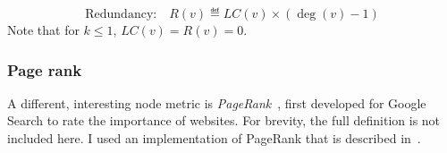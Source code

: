\begin{equation}
    \text{Redundancy:}\quad R(v) \eqdef LC (v) \times (\deg(v) - 1)
\end{equation}
Note that for $k \leq 1$, $LC(v) = R(v) = 0$.

\subsubsection*{Page rank}

A different, interesting node metric is \textsl{PageRank}~\cite{BrinAnatomyLargescaleHypertextual1998}, first developed for Google Search to rate the importance of websites.
For brevity, the full definition is not included here.
I used an implementation of PageRank that is described in~\cite{ilprints422}.


